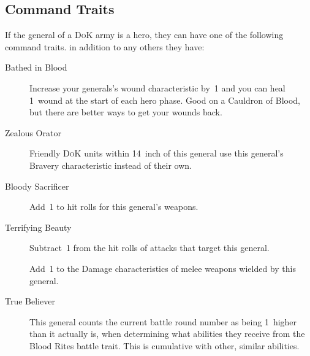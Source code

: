 \hypertarget{command-traits}{%
    \subsection{Command Traits}\label{command-traits}}
If the general of a \textsc{DoK} army is a hero, they can have
one of the following command traits. in addition to any others they
have: 
\begin{description} 
\item [Bathed in Blood] Increase your generals's wound characteristic by~1 and you 
  can heal 1~wound at the start of each hero phase. Good on a Cauldron of Blood, but 
  there are better ways to get your wounds back.
\item [Zealous Orator] Friendly \textsc{DoK} units
  within 14~inch of this general use this general's Bravery characteristic
  instead of their own.
\item [Bloody Sacrificer] Add~1 to hit rolls for this
  general's weapons.
\item [Terrifying Beauty] Subtract~1 from the hit rolls of
  attacks that target this general.
\item [{}] Add~1 to the Damage
  characteristics of melee weapons wielded by this general.
\item [True Believer] This general counts the current battle
  round number as being 1~higher than it actually is, when determining
  what abilities they receive from the Blood Rites battle trait.
  This is cumulative with other, similar abilities.
\end{description}


